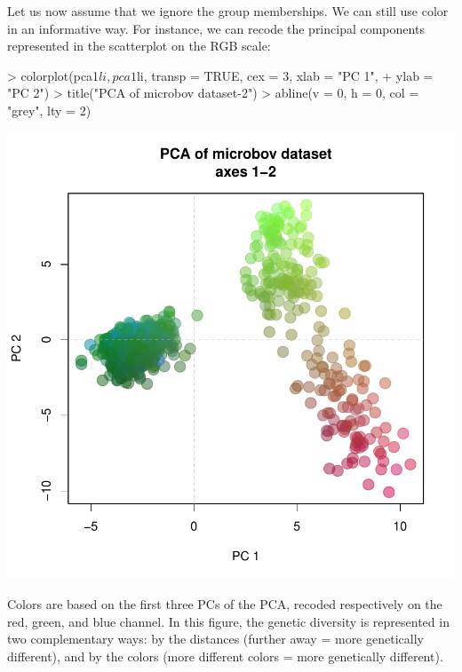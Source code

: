\documentclass{article}
\begin{document}
Let us now assume that we ignore the group memberships.
We can still use color in an informative way.
For instance, we can recode the principal components represented in the scatterplot on the RGB
scale:
\begin{Schunk}
\begin{Sinput}
> colorplot(pca1$li, pca1$li, transp = TRUE, cex = 3, xlab = "PC 1", 
+     ylab = "PC 2")
> title("PCA of microbov dataset-2")
> abline(v = 0, h = 0, col = "grey", lty = 2)
\end{Sinput}
\end{Schunk}
\includegraphics{figs/base-079}

\noindent Colors are based on the first three PCs of the PCA, recoded respectively on the red, green, and blue channel.
In this figure, the genetic diversity is represented in two complementary ways: by the distances
(further away = more genetically different), and by the colors (more different colors = more
genetically different).
\\
\end{document}
